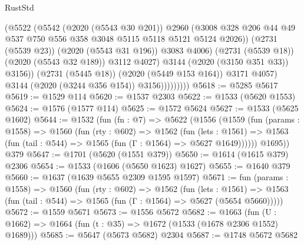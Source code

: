 \begin{lexlean}{RustStd}
\begin{coremodule}
                              (@5522
                                (@5542
                                  (@2020 (@5543 @30 @201))
                                  @2960
                                  (@3008
                                    @328
                                    @206
                                    @44
                                    @49
                                    @537
                                    @750
                                    @556
                                    @358
                                    @3048
                                    @5115
                                    @5118
                                    @5121
                                    @5124
                                    @2026))
                                (@2731 (@5539 @23))
                                (@2020 (@5543 @31 @196))
                                @3083
                                @4006)
                              (@2731 (@5539 @18))
                              (@2020 (@5543 @32 @189))
                              @3112
                              @4027)
                            @3144
                            (@2020 (@3150 @351 @33))
                            @3156))
                        (@2731 (@5445 @18))
                        (@2020 (@5449 @153 @164))
                        @3171
                        @4057)
                      @3144
                      (@2020 (@3244 @356 @154))
                      @3156)))))))))
@5618 := @5285 @5617
@5619 := @1529 @114
@5620 := @1537 @2303
@5622 := @1533 (@5620 @1553)
@5624 := @1576 (@1577 @114)
@5625 := @1572 @5624
@5627 := @1533 (@5625 @1602)
@5644 := @1532
    (fun (fn : @7) =>
    @5622
      (@1556
        (@1559
          (fun (params : @1558) =>
          @1560
            (fun (rty : @602) =>
            @1562
              (fun (lets : @1561) =>
              @1563 (fun (tail : @544) => @1565 (fun (Γ : @1564) => @5627 @1649))))))
        @1695))
    @379
@5647 := @1701 (@5620 (@1551 @379))
@5650 := @1614 (@1615 @379) @2306
@5654 := @1533 (@1606 (@5650 @1623) @1627)
@5655 := @1640 @379
@5660 := @1637 (@1639 @5655 @2309 @1595 @1597)
@5671 := fun (params : @1558) =>
  @1560
    (fun (rty : @602) =>
    @1562
      (fun (lets : @1561) =>
      @1563 (fun (tail : @544) => @1565 (fun (Γ : @1564) => @5627 (@5654 @5660)))))
@5672 := @1559 @5671
@5673 := @1556 @5672
@5682 := @1663 (fun (U : @1662) => @1664 (fun (t : @35) => @1672 (@1533 (@1678 @2306 @1552) @1689)))
@5685 := @5647 (@5673 @5682) @2304
@5687 := @1748 @5672 @5682

\end{coremodule}
\end{lexlean}
